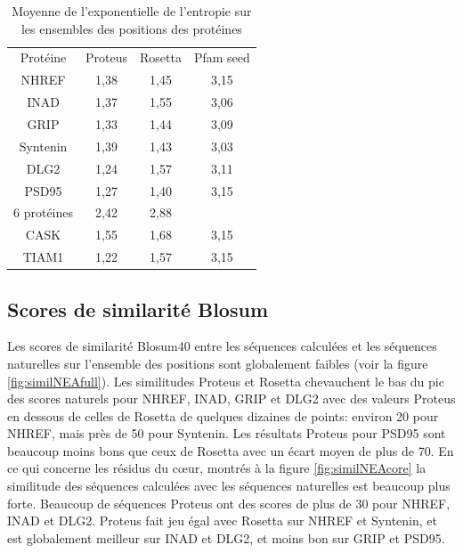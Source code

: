     \begin{table}[!htbp]
      \centering
      \caption{Moyenne de l'exponentielle de l'entropie sur les ensembles des positions des protéines}
      \label{tab:Entropie_PDZ}      
      \begin{tabular}{cccc}
        \toprule
        Protéine & Proteus & Rosetta & Pfam seed \\
        \cmidrule{1-4}
        NHREF  & 1,38 & 1,45 & 3,15  \\
        INAD  & 1,37 & 1,55 & 3,06  \\
        GRIP  & 1,33 & 1,44 & 3,09  \\
        Syntenin  & 1,39 & 1,43 & 3,03  \\
        DLG2  & 1,24 & 1,57 & 3,11  \\
        PSD95  & 1,27 & 1,40 & 3,15  \\
        6 protéines & 2,42  & 2,88 &    \\
        \cmidrule{1-4}
        CASK  & 1,55 & 1,68 & 3,15  \\
        TIAM1 & 1,22 & 1,57 & 3,15  \\
        \bottomrule
      \end{tabular}      
    \end{table}
        
\subsection{Scores de similarité Blosum}

Les scores de similarité Blosum40 entre les séquences calculées et les séquences naturelles sur l'ensemble des positions sont globalement faibles (voir la figure \ref{fig:similNEAfull}). Les similitudes Proteus et Rosetta chevauchent le bas du pic des scores naturels pour NHREF, INAD, GRIP et DLG2 avec des valeurs Proteus en dessous de celles de Rosetta de quelques dizaines de points: environ 20 pour NHREF, mais près de 50 pour Syntenin. Les résultats Proteus pour PSD95 sont beaucoup moins bons que ceux de Rosetta avec un écart moyen de plus de 70. En ce qui concerne les résidus du cœur, montrés à la figure  \ref{fig:similNEAcore} la similitude des séquences calculées avec les séquences naturelles est beaucoup plus forte. Beaucoup de séquences Proteus ont des scores de plus de 30 pour NHREF, INAD et DLG2. Proteus fait jeu égal avec Rosetta sur NHREF et Syntenin, et est globalement meilleur sur INAD et DLG2, et moins bon sur GRIP et PSD95. 


